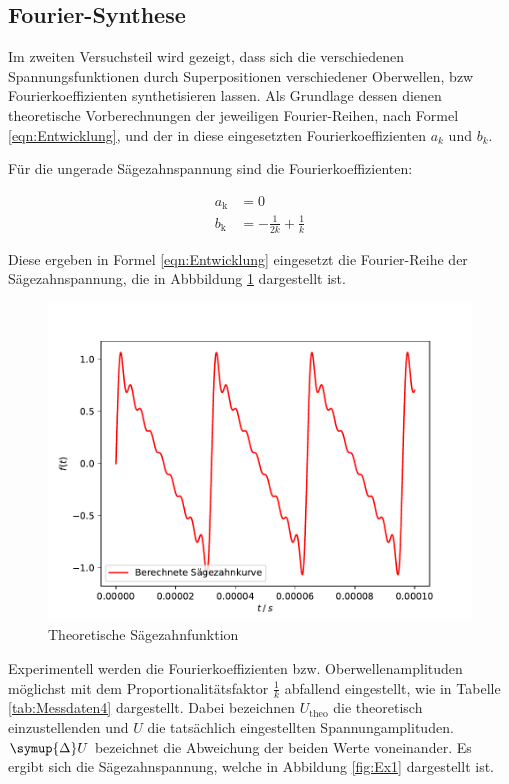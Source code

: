 \subsection{Fourier-Synthese}

Im zweiten Versuchsteil wird gezeigt, dass sich die verschiedenen Spannungsfunktionen
durch Superpositionen verschiedener Oberwellen, bzw Fourierkoeffizienten synthetisieren
lassen. Als Grundlage dessen dienen theoretische Vorberechnungen der jeweiligen
Fourier-Reihen, nach Formel \eqref{eqn:Entwicklung}, und der in diese eingesetzten
Fourierkoeffizienten $a_k$ und $b_k$.

Für die ungerade Sägezahnspannung sind die Fourierkoeffizienten:

\begin{align*}
    a_\text{k} &= 0 \\
    b_\text{k} &= - \frac{1}{2k} + \frac{1}{k}
\end{align*}

Diese ergeben in Formel \eqref{eqn:Entwicklung} eingesetzt die Fourier-Reihe
der Sägezahnspannung, die in Abbbildung \ref{fig:Theo1}  dargestellt ist.

\begin{figure}
    \includegraphics[scale = 1.0]{content/plot4.pdf}
    \caption{Theoretische Sägezahnfunktion}
    \label{fig:Theo1}
\end{figure}

Experimentell werden die Fourierkoeffizienten bzw. Oberwellenamplituden möglichst mit dem
Proportionalitätsfaktor $\frac{1}{k}$ abfallend eingestellt, wie in Tabelle \ref{tab:Messdaten4}
dargestellt. Dabei bezeichnen $U_\text{theo}$ die theoretisch einzustellenden und $U$ die
tatsächlich eingestellten Spannungamplituden. $\symup{\Delta}U$ bezeichnet die Abweichung der
beiden Werte voneinander. Es ergibt sich die Sägezahnspannung, welche in Abbildung \ref{fig:Ex1}
dargestellt ist.

